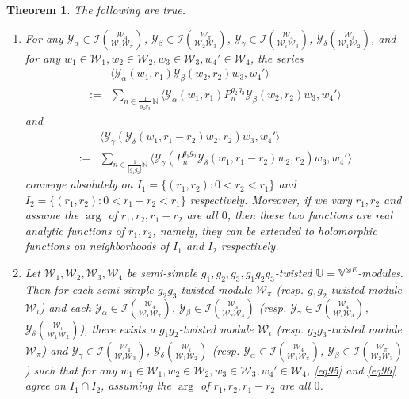 \documentclass[11pt,b5paper,notitlepage]{article}
\theoremstyle{definition}
\theoremstyle{plain}
\newtheorem{thm}[df]{Theorem}
\newcommand{\mc}{\mathcal}
\newcommand{\bk}[1]{\langle {#1}\rangle}
\newcommand{\Vbb}{\mathbb V}
\newcommand{\Ubb}{\mathbb U}
\newcommand{\Nbb}{\mathbb N}
\numberwithin{equation}{subsection}
\begin{document}
\begin{thm}\label{lb63}
The following are true.
\begin{enumerate}
\item For any $\mc Y_\alpha\in\mc I{\mc W_4\choose \mc W_1\mc W_\pi}$, $\mc Y_\beta\in\mc I{\mc W_\pi\choose\mc W_2\mc W_3}$, $\mc Y_\gamma\in\mc I{\mc W_4\choose\mc W_\iota\mc W_3}$, $\mc Y_\delta{\mc W_\iota\choose\mc W_1\mc W_2}$, and for any $w_1\in\mc W_1,w_2\in\mc W_2,w_3\in\mc W_3,w_4'\in\mc W_4$, the series
\begin{align}
&\bk{\mc Y_\alpha(w_1,r_1)\mc Y_\beta(w_2,r_2)w_3,w_4'}\nonumber\\
:=&\sum_{n\in\frac 1{|g_2g_3|}\Nbb}\bk{\mc Y_\alpha(w_1,r_1)P_n^{g_2g_3}\mc Y_\beta(w_2,r_2)w_3,w_4'}\label{eq95}
\end{align}
and
\begin{align}
&\bk{\mc Y_\gamma(\mc Y_\delta(w_1,r_1-r_2)w_2,r_2)w_3,w_4'}\nonumber\\
:=&\sum_{n\in\frac 1{|g_1g_2|}\Nbb}\bk{\mc Y_\gamma(P_n^{g_1g_2}\mc Y_\delta(w_1,r_1-r_2)w_2,r_2)w_3,w_4'}\label{eq96}
\end{align}
converge absolutely on $I_1=\{(r_1,r_2):0<r_2<r_1\}$ and  $I_2=\{(r_1,r_2):0<r_1-r_2<r_1\}$ respectively. Moreover, if we vary $r_1,r_2$ and assume the $\arg$ of $r_1,r_2,r_1-r_2$ are all $0$, then these two functions are real analytic functions of  $r_1,r_2$, namely, they can be extended to holomorphic functions on neighborhoods of $I_1$ and $I_2$ respectively.

\item Let $\mc W_1,\mc W_2,\mc W_3,\mc W_4$ be semi-simple $g_1,g_2,g_3,g_1g_2g_3$-twisted $\Ubb=\Vbb^{\otimes E}$-modules. Then for each semi-simple $g_2g_3$-twisted module $\mc W_\pi$ (resp. $g_1g_2$-twisted module $\mc W_\iota$) and each $\mc Y_\alpha\in\mc I{\mc W_4\choose \mc W_1\mc W_\pi}$, $\mc Y_\beta\in\mc I{\mc W_\pi\choose\mc W_2\mc W_3}$ (resp. $\mc Y_\gamma\in\mc I{\mc W_4\choose\mc W_\iota\mc W_3}$, $\mc Y_\delta{\mc W_\iota\choose\mc W_1\mc W_2}$), there exists a $g_1g_2$-twisted module $\mc W_\iota$ (resp. $g_2g_3$-twisted module $\mc W_\pi$) and $\mc Y_\gamma\in\mc I{\mc W_4\choose\mc W_\iota\mc W_3}$, $\mc Y_\delta{\mc W_\iota\choose\mc W_1\mc W_2}$ (resp. $\mc Y_\alpha\in\mc I{\mc W_4\choose \mc W_1\mc W_\pi}$, $\mc Y_\beta\in\mc I{\mc W_\pi\choose\mc W_2\mc W_3}$) such that for any $w_1\in\mc W_1,w_2\in\mc W_2,w_3\in\mc W_3,w_4'\in\mc W_4$, \eqref{eq95} and \eqref{eq96} agree on $I_1\cap I_2$, assuming the $\arg$ of $r_1,r_2,r_1-r_2$ are all $0$.
\end{enumerate}
\end{thm}
\end{document}
